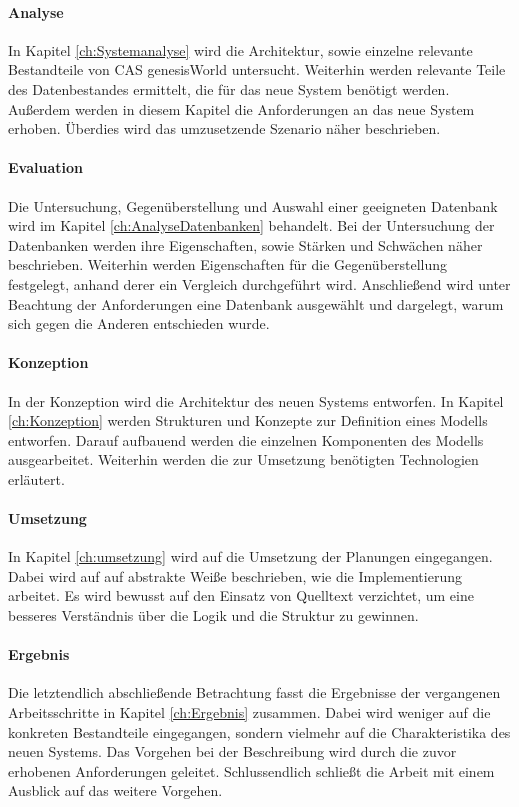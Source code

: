 \paragraph{Analyse} In Kapitel \ref{ch:Systemanalyse} wird die Architektur, sowie einzelne relevante Bestandteile von CAS genesisWorld untersucht. Weiterhin werden relevante Teile des Datenbestandes ermittelt, die für das neue System benötigt werden. Außerdem werden in diesem Kapitel die Anforderungen an das neue System erhoben. Überdies wird das umzusetzende Szenario näher beschrieben. 

\paragraph{Evaluation} Die Untersuchung, Gegenüberstellung und Auswahl einer geeigneten Datenbank wird im Kapitel \ref{ch:AnalyseDatenbanken} behandelt. Bei der Untersuchung der Datenbanken werden ihre Eigenschaften, sowie Stärken und Schwächen näher beschrieben. Weiterhin werden Eigenschaften für die Gegenüberstellung festgelegt, anhand derer ein Vergleich durchgeführt wird. Anschließend wird unter Beachtung der Anforderungen eine Datenbank ausgewählt und dargelegt, warum sich gegen die Anderen entschieden wurde.  

\paragraph{Konzeption} In der Konzeption wird die Architektur des neuen Systems entworfen. In Kapitel \ref{ch:Konzeption} werden Strukturen und Konzepte zur Definition eines Modells entworfen. Darauf aufbauend werden die einzelnen Komponenten des Modells ausgearbeitet. Weiterhin werden die zur Umsetzung benötigten Technologien  erläutert. 

\paragraph{Umsetzung} In Kapitel \ref{ch:umsetzung} wird auf die Umsetzung der Planungen eingegangen. Dabei wird auf auf abstrakte Weiße beschrieben, wie die Implementierung arbeitet. Es wird bewusst auf den Einsatz von Quelltext verzichtet, um eine besseres Verständnis über die Logik und die Struktur zu gewinnen. 

\paragraph{Ergebnis} Die letztendlich abschließende Betrachtung fasst die Ergebnisse der vergangenen Arbeitsschritte in Kapitel \ref{ch:Ergebnis} zusammen. Dabei wird weniger auf die konkreten Bestandteile eingegangen, sondern vielmehr auf die Charakteristika des neuen Systems. Das Vorgehen bei der Beschreibung wird durch die zuvor erhobenen Anforderungen geleitet. Schlussendlich schließt die Arbeit mit einem Ausblick auf das weitere Vorgehen. 


